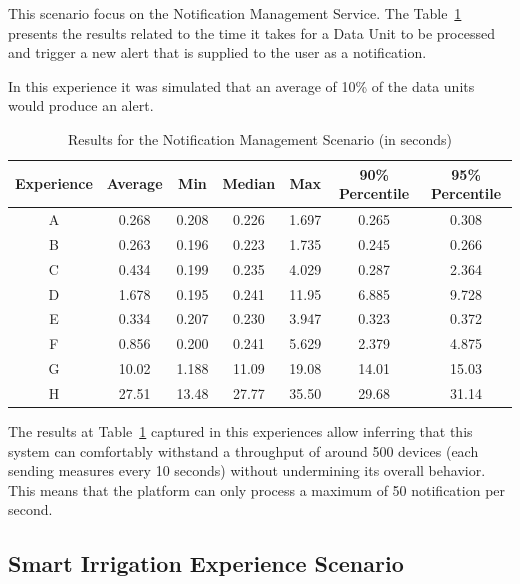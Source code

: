This scenario focus on the Notification Management Service. The Table~\ref{tab:evaluation:experiences:notification:results} presents the results related to the time it takes for a Data Unit to be processed and trigger a new alert that is supplied to the user as a notification.

In this experience it was simulated that an average of 10\% of the data units would produce an alert.

\begin{table}[H]
    \caption{Results for the Notification Management Scenario (in seconds)}
    \label{tab:evaluation:experiences:notification:results}
    \centering
    \begin{tabular}{@{}ccccccc@{}}
    \toprule
    \textbf{Experience} & \textbf{Average} & \textbf{Min} & \textbf{Median} & \textbf{Max} & \textbf{90\% Percentile} & \textbf{95\% Percentile} \\ \midrule
    A & 0.268 & 0.208 & 0.226 & 1.697 & 0.265 & 0.308 \\ \midrule
    B & 0.263 & 0.196 & 0.223 & 1.735 & 0.245 & 0.266 \\ \midrule
    C & 0.434 & 0.199 & 0.235 & 4.029 & 0.287 & 2.364 \\ \midrule
    D & 1.678 & 0.195 & 0.241 & 11.95 & 6.885 & 9.728 \\ \midrule
    E & 0.334 & 0.207 & 0.230 & 3.947 & 0.323 & 0.372 \\ \midrule
    F & 0.856 & 0.200 & 0.241 & 5.629 & 2.379 & 4.875 \\ \midrule
    G & 10.02 & 1.188 & 11.09 & 19.08 & 14.01 & 15.03 \\ \midrule
    H & 27.51 & 13.48 & 27.77 & 35.50 & 29.68 & 31.14 \\ \bottomrule
    \end{tabular}
\end{table}

The results at Table~\ref{tab:evaluation:experiences:notification:results} captured in this experiences allow inferring that this system can comfortably withstand a throughput of around 500 devices (each sending measures every 10 seconds) without undermining its overall behavior. This means that the platform can only process a maximum of 50 notification per second. 

\subsection{Smart Irrigation Experience Scenario}
\label{subsec:evaluation:experiences:irrigation}

